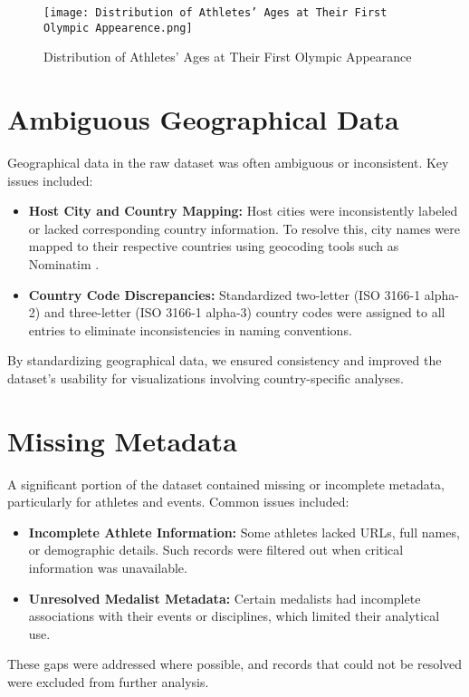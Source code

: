 \begin{figure}[ht]
    \centering
    \texttt{[image: Distribution of Athletes' Ages at Their First Olympic Appearence.png]}
    \caption{Distribution of Athletes' Ages at Their First Olympic Appearance}
    \label{fig:athlete_ages}
\end{figure}

\section{Ambiguous Geographical Data}

Geographical data in the raw dataset was often ambiguous or inconsistent. Key issues included:

\begin{itemize}
    \item \textbf{Host City and Country Mapping:} Host cities were inconsistently labeled or lacked corresponding country information. To resolve this, city names were mapped to their respective countries using geocoding tools such as Nominatim \cite{nominatim}.
    \item \textbf{Country Code Discrepancies:} Standardized two-letter (ISO 3166-1 alpha-2) and three-letter (ISO 3166-1 alpha-3) country codes were assigned to all entries to eliminate inconsistencies in naming conventions.
\end{itemize}

By standardizing geographical data, we ensured consistency and improved the dataset's usability for visualizations involving country-specific analyses.


\section{Missing Metadata}

A significant portion of the dataset contained missing or incomplete metadata, particularly for athletes and events. Common issues included:

\begin{itemize}
    \item \textbf{Incomplete Athlete Information:} Some athletes lacked URLs, full names, or demographic details. Such records were filtered out when critical information was unavailable.
    \item \textbf{Unresolved Medalist Metadata:} Certain medalists had incomplete associations with their events or disciplines, which limited their analytical use.
\end{itemize}

These gaps were addressed where possible, and records that could not be resolved were excluded from further analysis.
